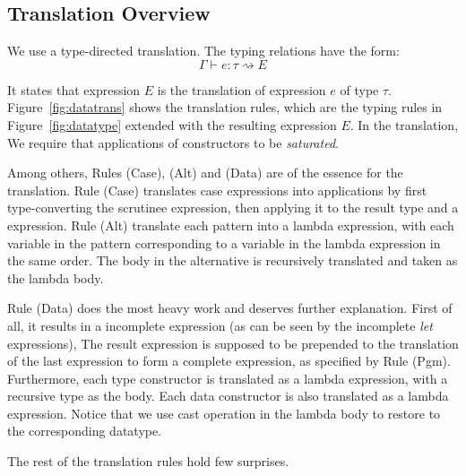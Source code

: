 \subsection{Translation Overview}

We use a type-directed translation. The typing relations have the form: \[\Gamma \vdash e : \tau \rightsquigarrow E \]

It states that \name expression $E$ is the translation of \sufcc expression $e$ of type $\tau$. Figure~\ref{fig:datatrans} shows the translation rules, which are the typing rules in Figure~\ref{fig:datatype} extended with the resulting expression $E$. In the translation, We require that applications of constructors to be \emph{saturated}.

Among others, Rules (Case), (Alt) and (Data) are of the essence for the translation. Rule (Case) translates case expressions into applications by first type-converting the scrutinee expression, then applying it to the result type and a \name expression. Rule (Alt) translate each pattern into a lambda expression, with each variable in the pattern corresponding to a variable in the lambda expression in the same order. The body in the alternative is recursively translated and taken as the lambda body. 

Rule (Data) does the most heavy work and deserves further explanation. First of all, it results in a incomplete expression (as can be seen by the incomplete \emph{let} expressions), The result expression is supposed to be prepended to the translation of the last expression to form a complete \name expression, as specified by Rule (Pgm). Furthermore, each type constructor is translated as a lambda expression, with a recursive type as the body. Each data constructor is also translated as a lambda expression. Notice that we use cast operation in the lambda body to restore to the corresponding datatype.

The rest of the translation rules hold few surprises.

